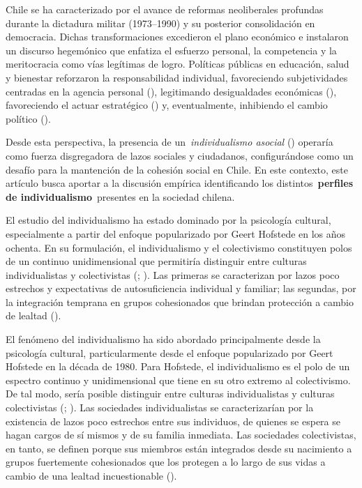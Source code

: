 \documentclass[
  12pt,
  letterpaper,
  DIV=11,
  numbers=noendperiod]{scrartcl}
\begin{document}
Chile se ha caracterizado por el avance de reformas neoliberales
profundas durante la dictadura militar (1973--1990) y su posterior
consolidación en democracia. Dichas transformaciones excedieron el plano
económico e instalaron un discurso hegemónico que enfatiza el esfuerzo
personal, la competencia y la meritocracia como vías legítimas de logro.
Políticas públicas en educación, salud y bienestar reforzaron la
responsabilidad individual, favoreciendo subjetividades centradas en la
agencia personal (), legitimando desigualdades económicas
(),
favoreciendo el actuar estratégico () y, eventualmente, inhibiendo el cambio político
().

Desde esta perspectiva, la presencia de un~\emph{individualismo asocial}
() operaría como fuerza disgregadora
de lazos sociales y ciudadanos, configurándose como un desafío para la
mantención de la cohesión social en Chile. En este contexto, este
artículo busca aportar a la discusión empírica identificando los
distintos~\textbf{perfiles de individualismo}~presentes en la sociedad
chilena.

El estudio del individualismo ha estado dominado por la psicología
cultural, especialmente a partir del enfoque popularizado por Geert
Hofstede en los años ochenta. En su formulación, el individualismo y el
colectivismo constituyen polos de un continuo unidimensional que
permitiría distinguir entre culturas individualistas y colectivistas
(;
). Las primeras se caracterizan por
lazos poco estrechos y expectativas de autosuficiencia individual y
familiar; las segundas, por la integración temprana en grupos
cohesionados que brindan protección a cambio de lealtad
().

El fenómeno del individualismo ha sido abordado principalmente desde la
psicología cultural, particularmente desde el enfoque popularizado por
Geert Hofstede en la década de 1980. Para Hofstede, el individualismo es
el polo de un espectro continuo y unidimensional que tiene en su otro
extremo al colectivismo. De tal modo, sería posible distinguir entre
culturas individualistas y culturas colectivistas
(;
). Las sociedades individualistas se
caracterizarían por la existencia de lazos poco estrechos entre sus
individuos, de quienes se espera se hagan cargos de sí mismos y de su
familia inmediata. Las sociedades colectivistas, en tanto, se definen
porque sus miembros están integrados desde su nacimiento a grupos
fuertemente cohesionados que los protegen a lo largo de sus vidas a
cambio de una lealtad incuestionable ().
\end{document}
